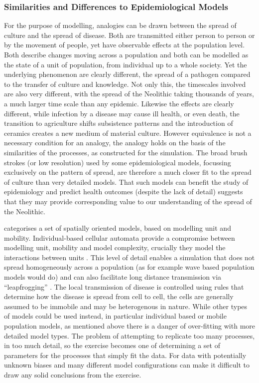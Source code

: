 \subsubsection{Similarities and Differences to Epidemiological Models}
For the purpose of modelling, analogies can be drawn between the spread of culture and the spread of disease. Both are transmitted either person to person or by the movement of people, yet have observable effects at the population level. Both describe changes moving across a population and both can be modelled as the state of a unit of population, from individual up to a whole society. Yet the underlying phenomenon are clearly different, the spread of a pathogen compared to the transfer of culture and knowledge. Not only this, the timescales involved are also very different, with the spread of the Neolithic taking thousands of years, a much larger time scale than any epidemic. Likewise the effects are clearly different, while infection by a disease may cause ill health, or even death, the transition to agriculture shifts subsistence patterns and the introduction of ceramics creates a new medium of material culture. However equivalence is not a necessary condition for an analogy, the analogy holds on the basis of the similarities of the processes, as constructed for the simulation. The broad brush strokes (or low resolution) used by some epidemiological models, focussing exclusively on the pattern of spread, are therefore a much closer fit to the spread of culture than very detailed models. That such models can benefit the study of epidemiology and predict health outcomes \citep[4]{doi:10.1111/j.1467-9671.2012.01329.x} (despite the lack of detail) suggests that they may provide corresponding value to our understanding of the spread of the Neolithic.

\citet{doi:10.1111/j.1467-9671.2012.01329.x} categorises a set of spatially oriented models, based on modelling unit and mobility. Individual-based cellular automata provide a compromise between modelling unit, mobility and model complexity, crucially they model the interactions between units \citep[e.g.][]{WHITE2007193,FUENTES1999471,Yang:2017fk}. This level of detail enables a simulation that does not spread homogeneously across a population (as for example wave based population models would do) and can also facilitate long distance transmission via ``leapfrogging'' \citep[6]{doi:10.1111/j.1467-9671.2012.01329.x}. The local transmission of disease is controlled using rules that determine how the disease is spread from cell to cell, the cells are generally assumed to be immobile and may be heterogenous in nature. While other types of models could be used instead, in particular individual based or mobile population models, as mentioned above there is a danger of over-fitting with more detailed model types. The problem of attempting to replicate too many processes, in too much detail, so the exercise becomes one of determining a set of parameters for the processes that simply fit the data. For data with potentially unknown biases and many different model configurations can make it difficult to draw any solid conclusions from the exercise.

